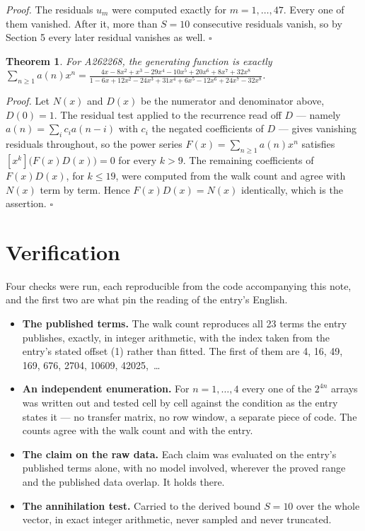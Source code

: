 \documentclass[11pt]{article}
\newtheorem{theorem}{Theorem}
\theoremstyle{definition}
\begin{document}
{\itshape Proof.} The residuals $u_m$ were computed exactly for $m = 1,\dots,47$. Every one of them vanished. After it, more than $S = 10$ consecutive residuals vanish, so by Section 5 every later residual vanishes as well. $\square$

\begin{theorem} For A262268, the generating function is exactly $\sum_{n\ge 1} a(n)x^n = \frac{4x - 8x^{2} + x^{3} - 29x^{4} - 10x^{5} + 20x^{6} + 8x^{7} + 32x^{8}}{1 - 6x + 12x^{2} - 24x^{3} + 31x^{4} + 6x^{5} - 12x^{6} + 24x^{7} - 32x^{8}}$.\end{theorem}

{\itshape Proof.} Let $N(x)$ and $D(x)$ be the numerator and denominator above, $D(0)=1$. The residual test applied to the recurrence read off $D$ --- namely $a(n) = \sum_i c_i a(n-i)$ with $c_i$ the negated coefficients of $D$ --- gives vanishing residuals throughout, so the power series $F(x)=\sum_{n\ge 1}a(n)x^n$ satisfies $[x^k]\bigl(F(x)D(x)\bigr) = 0$ for every $k > 9$. The remaining coefficients of $F(x)D(x)$, for $k \le 19$, were computed from the walk count and agree with $N(x)$ term by term. Hence $F(x)D(x) = N(x)$ identically, which is the assertion. $\square$

\section{Verification}

Four checks were run, each reproducible from the code accompanying this note, and the first two are what pin the reading of the entry's English.

\begin{itemize}

\item {\bfseries The published terms.} The walk count reproduces all 23 terms the entry publishes, exactly, in integer arithmetic, with the index taken from the entry's stated offset (1) rather than fitted. The first of them are 4, 16, 49, 169, 676, 2704, 10609, 42025,~\dots

\item {\bfseries An independent enumeration.} For $n = 1,\dots,4$ every one of the $2^{4n}$ arrays was written out and tested cell by cell against the condition as the entry states it --- no transfer matrix, no row window, a separate piece of code. The counts agree with the walk count and with the entry.

\item {\bfseries The claim on the raw data.} Each claim was evaluated on the entry's published terms alone, with no model involved, wherever the proved range and the published data overlap. It holds there.

\item {\bfseries The annihilation test.} Carried to the derived bound $S = 10$ over the whole vector, in exact integer arithmetic, never sampled and never truncated.

\end{itemize}
\end{document}
